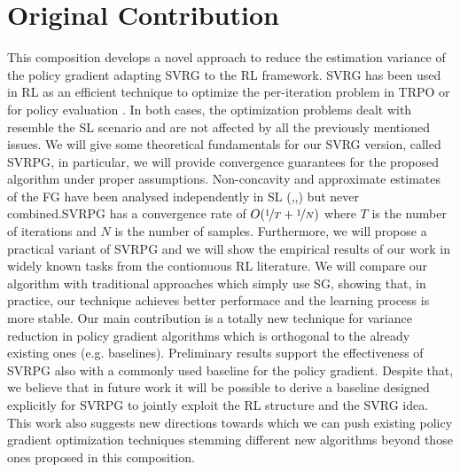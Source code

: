 \section{Original Contribution}
This composition develops a novel approach to reduce the estimation variance of the policy gradient adapting \acs{SVRG} to the \acs{RL} framework.\newline 
\acs{SVRG} has been used in \acs{RL} as an efficient technique to optimize the per-iteration problem in \ac{TRPO} \citep{xu2017stochastic} or for policy evaluation \citep{du2017stochastic}. In both cases, the optimization problems dealt with resemble the \acs{SL} scenario and are not affected by all the previously mentioned issues.
We will give some theoretical fundamentals for our \acs{SVRG} version, called \acf{SVRPG}, in particular, we will provide convergence guarantees for the proposed algorithm under proper assumptions. Non-concavity and approximate estimates of the \acf{FG} have been analysed independently in \acs{SL} (\cite{allen2016variance},\cite{reddi2016stochastic},\cite{harikandeh2015stopwasting}) but never combined.\newline \acs{SVRPG} has a convergence rate of $O(\nicefrac{1}{T}+\nicefrac{1}{N})$ where $T$ is the number of iterations and $N$ is the number of samples.\newline
 Furthermore, we will propose a practical variant of \acs{SVRPG} and we will show the empirical results of our work in widely known tasks from the contionuous \acs{RL} literature. We will compare our algorithm with traditional approaches which simply use \acs{SG}, showing that, in practice, our technique achieves better performace and the learning process is more stable.\newline
Our main contribution is a totally new technique for variance reduction in policy gradient algorithms which is orthogonal to the already existing ones (e.g. baselines).
Preliminary results support the effectiveness of \acs{SVRPG} also with a commonly used baseline for the policy gradient. Despite that, we believe that in future work it will be possible to derive a baseline designed explicitly for \acs{SVRPG} to jointly exploit the \acs{RL} structure and the \acs{SVRG} idea.\newline
This work also suggests new directions towards which we can push existing policy gradient optimization techniques stemming different new algorithms beyond those ones proposed in this composition.\newline
